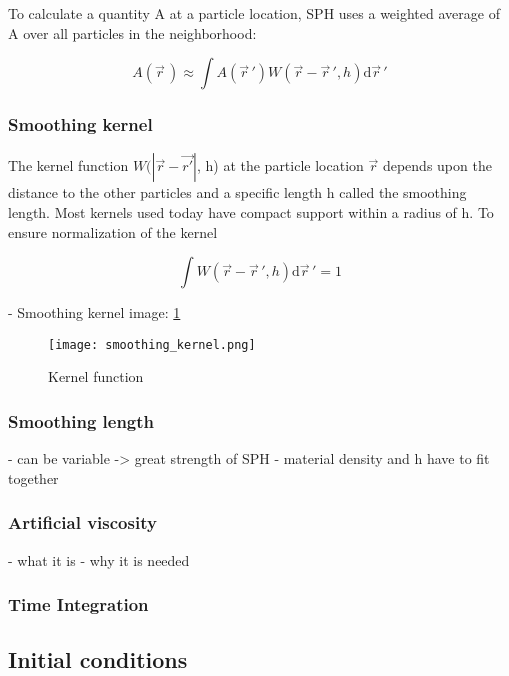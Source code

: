 To calculate a quantity A at a particle location, SPH uses a weighted average of A over all particles in the neighborhood:

\begin{equation}
    A(\vec{r}\,) \approx \int A(\vec{r}\,') W(\vec{r} - \vec{r}\,', h) \mathrm d\vec{r}\,'
\end{equation}

\subsubsection{Smoothing kernel}
The kernel function $W(|\vec{r} - \vec{r'}|$, h) at the particle location $\vec{r}$ depends upon the distance to the other particles and a specific length h called the smoothing length. Most kernels used today have compact support within a radius of h. To ensure normalization of the kernel

\begin{equation} \label{eq:kernel_normalization}
    \int W(\vec{r} - \vec{r}\,', h)\mathrm d\vec{r}\,' = 1
\end{equation}

- Smoothing kernel image: \ref{fig:smoothing_kernel}

\begin{figure}[H]
    \centering
    \texttt{[image: smoothing\_kernel.png]}
    \caption{Kernel function \cite{image:smoothing_kernel}}
    \label{fig:smoothing_kernel}
\end{figure}

\subsubsection{Smoothing length}
- can be variable -> great strength of SPH
- material density and h have to fit together

\subsubsection{Artificial viscosity}
- what it is
- why it is needed

\subsubsection{Time Integration}

\subsection{Initial conditions}
